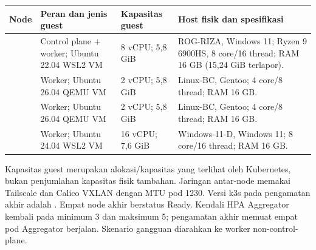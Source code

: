 \begin{longtable}{@{}P{1.5cm}P{4.2cm}P{3.3cm}P{6.3cm}@{}}
\toprule Node & Peran dan jenis guest & Kapasitas guest & Host fisik dan spesifikasi\\\midrule\endhead
{} & Control plane + worker; Ubuntu 22.04 WSL2 VM & 8 vCPU; 5,8 GiB & ROG-RIZA, Windows 11; Ryzen 9 6900HS, 8 core/16 thread; RAM 16 GB (15,24 GiB terlapor).\\
 & Worker; Ubuntu 26.04 QEMU VM & 2 vCPU; 5,8 GiB & Linux-BC, Gentoo; 4 core/8 thread; RAM 16 GB.\\
 & Worker; Ubuntu 26.04 QEMU VM & 2 vCPU; 5,8 GiB & Linux-BC, Gentoo; 4 core/8 thread; RAM 16 GB.\\
 & Worker; Ubuntu 24.04 WSL2 VM & 16 vCPU; 7,6 GiB & Windows-11-D, Windows 11; 8 core/16 thread; RAM 16 GB.\\\bottomrule
\end{longtable}

Kapasitas guest merupakan alokasi/kapasitas yang terlihat oleh Kubernetes, bukan penjumlahan kapasitas fisik tambahan. Jaringan antar-node memakai Tailscale dan Calico VXLAN dengan MTU pod 1230. Versi k3s pada pengamatan akhir adalah . Empat node akhir berstatus Ready. Kendali HPA Aggregator kembali pada minimum 3 dan maksimum 5; pengamatan akhir memuat empat pod Aggregator berjalan. Skenario gangguan diarahkan ke worker non-control-plane.

